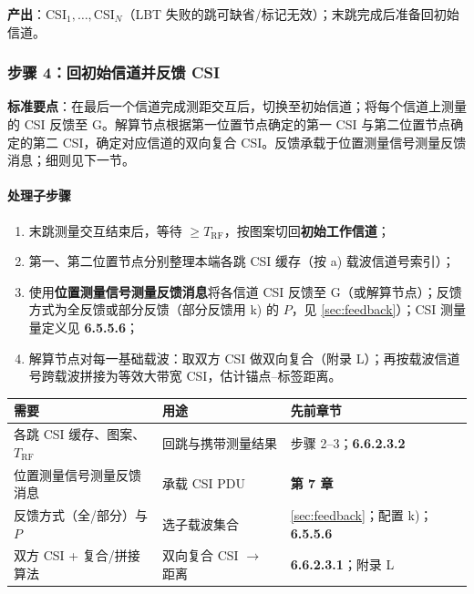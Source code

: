 \documentclass[11pt,a4paper]{ctexart}
\begin{document}
\textbf{产出}：CSI$_1,\ldots,$CSI$_N$（LBT 失败的跳可缺省/标记无效）；末跳完成后准备回初始信道。

\subsubsection*{步骤 4：回初始信道并反馈 CSI}

\textbf{标准要点}：在最后一个信道完成测距交互后，切换至初始信道；将每个信道上测量的 CSI 反馈至 G。解算节点根据第一位置节点确定的第一 CSI 与第二位置节点确定的第二 CSI，确定对应信道的双向复合 CSI。反馈承载于位置测量信号测量反馈消息；细则见下一节。

\paragraph{处理子步骤}
\begin{enumerate}[leftmargin=2em,nosep]
  \item 末跳测量交互结束后，等待 $\ge T_{\mathrm{RF}}$，按图案切回\textbf{初始工作信道}；
  \item 第一、第二位置节点分别整理本端各跳 CSI 缓存（按 a) 载波信道号索引）；
  \item 使用\textbf{位置测量信号测量反馈消息}将各信道 CSI 反馈至 G（或解算节点）；反馈方式为全反馈或部分反馈（部分反馈用 k) 的 $P$，见 \ref{sec:feedback}）；CSI 测量量定义见 \textbf{6.5.5.6}；
  \item 解算节点对每一基础载波：取双方 CSI 做双向复合（附录 L）；再按载波信道号跨载波拼接为等效大带宽 CSI，估计锚点--标签距离。
\end{enumerate}

\begin{center}
\small
\begin{tabular}{|L{3.5cm}|L{4.5cm}|L{5cm}|}
\hline
\textbf{需要} & \textbf{用途} & \textbf{先前章节} \\
\hline
各跳 CSI 缓存、图案、$T_{\mathrm{RF}}$ & 回跳与携带测量结果 & 步骤 2--3；\textbf{6.6.2.3.2} \\
\hline
位置测量信号测量反馈消息 & 承载 CSI PDU & \textbf{第 7 章} \\
\hline
反馈方式（全/部分）与 $P$ & 选子载波集合 & \ref{sec:feedback}；配置 k)；\textbf{6.5.5.6} \\
\hline
双方 CSI + 复合/拼接算法 & 双向复合 CSI $\rightarrow$ 距离 & \textbf{6.6.2.3.1}；附录 L \\
\hline
\end{tabular}
\end{center}
\end{document}
